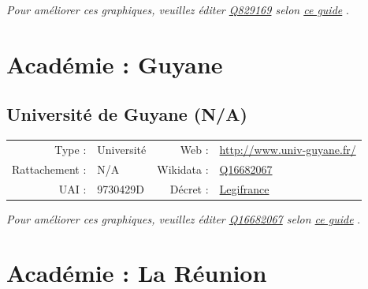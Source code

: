 \documentclass[11pt,french,landscape]{article}
\begin{document}
\textit{\scriptsize Pour améliorer ces graphiques, veuillez éditer \href{https://www.wikidata.org/entity/Q829169}{Q829169}  selon \href{https://github.com/cpesr/wikidataESR/blob/master/Rmd/wikidataESR.md}{ce guide}}
.


\newpage

\hypertarget{acaduxe9mie-guyane}{%
\section{Académie : Guyane}\label{acaduxe9mie-guyane}}

\hypertarget{universituxe9-de-guyane-na}{%
\subsection{Université de Guyane
(N/A)}\label{universituxe9-de-guyane-na}}

\begin{tabular*}{0.45\textwidth}{rp{2cm}rl}  
\hline  
Type : & Université & Web : &\href{http://www.univ-guyane.fr/}{http://www.univ-guyane.fr/} \\  
Rattachement : & N/A & Wikidata : & \href{https://www.wikidata.org/entity/Q16682067}{Q16682067} \\  
UAI : & 9730429D & Décret : & \href{http://www.legifrance.gouv.fr/affichTexte.do;jsessionid=?cidTexte=JORFTEXT000029310823&dateTexte=&oldAction=dernierJO&categorieLien=id}{Legifrance} \\  
\hline  
\end{tabular*}

\textit{\scriptsize Pour améliorer ces graphiques, veuillez éditer \href{https://www.wikidata.org/entity/Q16682067}{Q16682067}  selon \href{https://github.com/cpesr/wikidataESR/blob/master/Rmd/wikidataESR.md}{ce guide}}
.


\newpage

\hypertarget{acaduxe9mie-la-ruxe9union}{%
\section{Académie : La Réunion}\label{acaduxe9mie-la-ruxe9union}}
\end{document}
